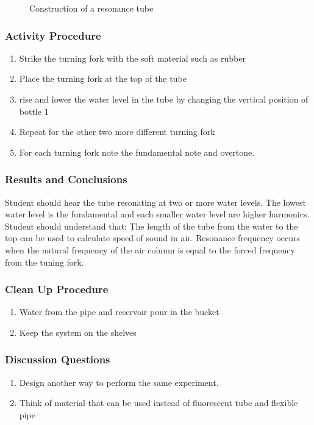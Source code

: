 \begin{figure}
\begin{center}
\def\svgwidth{200pt}

\caption{Construction of a resonance tube}
\label{fig:resonance-tube}
\end{center}
\end{figure}

\subsubsection*{Activity Procedure}
\begin{enumerate}
\item{Strike the turning fork with the soft material such as rubber}
\item{Place the turning fork at the top of the tube}
\item{rise and lower the water level in the tube by changing the vertical position of bottle 1}
\item{Repeat for the other two more different turning fork}
\item{For each turning fork note the fundamental note and overtone.} 
\end{enumerate}

\subsubsection*{Results and Conclusions}
Student should hear the tube resonating at two or more water levels. The lowest water level is the fundamental and each smaller water level are higher harmonics.  
Student should understand that: 
The length of the tube from the water to the top can be used to calculate speed of sound in air. 
Resonance frequency occurs when the natural frequency of the air column is equal to the forced frequency from the tuning fork.  

\subsubsection*{Clean Up Procedure}
\begin{enumerate}
\item{Water from the pipe and reservoir pour in the bucket}
\item{Keep the system on the shelves}
\end{enumerate}

\subsubsection*{Discussion Questions}
\begin{enumerate}
\item{Design another way to perform the same experiment.} 
\item{Think of material that can be used instead of fluorescent tube and flexible pipe}
\end{enumerate}

